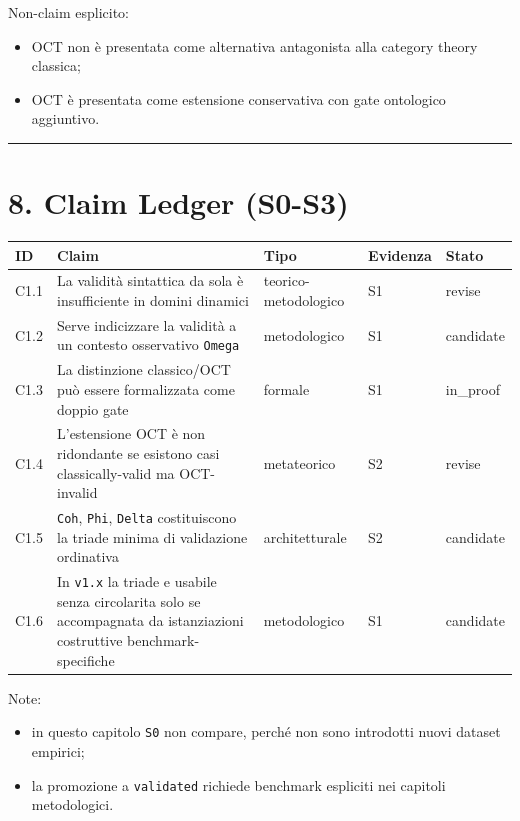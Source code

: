 Non-claim esplicito:

\begin{itemize}
\tightlist
\item
  OCT non è presentata come alternativa antagonista alla category theory classica;
\item
  OCT è presentata come estensione conservativa con gate ontologico aggiuntivo.
\end{itemize}

\begin{center}\rule{0.5\linewidth}{0.5pt}\end{center}

\section{8. Claim Ledger (S0-S3)}

{\def\LTcaptype{none} %
\begin{longtable}[]{@{}lllll@{}}
\toprule\noalign{}
ID & Claim & Tipo & Evidenza & Stato \\
\midrule\noalign{}
\endhead
\bottomrule\noalign{}
\endlastfoot
C1.1 & La validità sintattica da sola è insufficiente in domini dinamici & teorico-metodologico & S1 & revise \\
C1.2 & Serve indicizzare la validità a un contesto osservativo \texttt{Omega} & metodologico & S1 & candidate \\
C1.3 & La distinzione classico/OCT può essere formalizzata come doppio gate & formale & S1 & in\_proof \\
C1.4 & L'estensione OCT è non ridondante se esistono casi classically-valid ma OCT-invalid & metateorico & S2 & revise \\
C1.5 & \texttt{Coh}, \texttt{Phi}, \texttt{Delta} costituiscono la triade minima di validazione ordinativa & architetturale & S2 & candidate \\
C1.6 & In \texttt{v1.x} la triade e usabile senza circolarita solo se accompagnata da istanziazioni costruttive benchmark-specifiche & metodologico & S1 & candidate \\
\end{longtable}
}

Note:

\begin{itemize}
\tightlist
\item
  in questo capitolo \texttt{S0} non compare, perché non sono introdotti nuovi dataset empirici;
\item
  la promozione a \texttt{validated} richiede benchmark espliciti nei capitoli metodologici.
\end{itemize}

